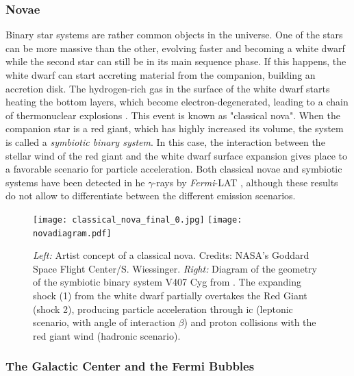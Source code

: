 \documentclass[main.tex]{subfiles}
\begin{document}
\subsubsection{Novae}

Binary star systems are rather common objects in the universe. One of the stars can be more massive than the other, evolving faster and becoming a white dwarf while the second star can still be in its main sequence phase. If this happens, the white dwarf can start accreting material from the companion, building an accretion disk. The hydrogen-rich gas in the surface of the white dwarf starts heating the bottom layers, which become electron-degenerated, leading to a chain of thermonuclear explosions \cite{bode_evans_2008}. This event is known as "classical nova".
When the companion star is a red giant, which has highly increased its volume, the system is called a \textit{symbiotic binary system}. In this case, the interaction between the stellar wind of the red giant and the white dwarf surface expansion gives place to a favorable scenario for particle acceleration.
 Both classical novae and symbiotic systems have been detected in \gls{he} $\gamma$-rays by \textit{Fermi}-LAT \cite{2010symbioticfermi}, \cite{2014fermiclassicNovae} although these results do not allow to differentiate between the different emission scenarios.
 
 \begin{figure}[!htb]
\texttt{[image: classical\_nova\_final\_0.jpg]}
\endminipage\hfill
{}
\texttt{[image: novadiagram.pdf]}
\endminipage\hfill
\caption{\label{fig:novae} \textit{Left:} Artist concept of a classical nova. Credits: NASA's Goddard Space Flight Center/S. Wiessinger. \textit{Right:} Diagram of the geometry of the symbiotic binary system V407 Cyg from \cite{2012novagammaneutrinos}. The expanding shock (1) from the white dwarf partially overtakes the Red Giant (shock 2), producing particle acceleration through \gls{ic} (leptonic scenario, with angle of interaction $\beta$) and proton collisions with the red giant wind (hadronic scenario).}
\end{figure}

\subsubsection{The Galactic Center and the Fermi Bubbles} \label{sec:GCFermiBubbles}
\end{document}
